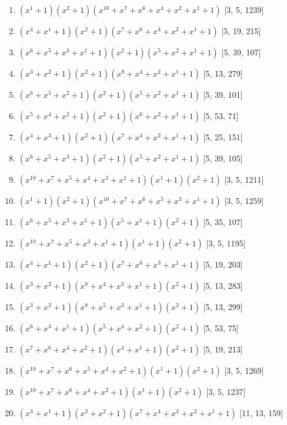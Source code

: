 \documentclass[10pt,twocolumn]{article}
\begin{document}
\begin{enumerate}
\item $(x^{1} + 1)(x^{2} + 1)(x^{10} + x^{7} + x^{6} + x^{4} + x^{2} + x^{1} + 1)$  [3, 5, 1239]
\item $(x^{4} + x^{1} + 1)(x^{2} + 1)(x^{7} + x^{6} + x^{4} + x^{2} + x^{1} + 1)$  [5, 19, 215]
\item $(x^{6} + x^{5} + x^{3} + x^{1} + 1)(x^{2} + 1)(x^{5} + x^{2} + x^{1} + 1)$  [5, 39, 107]
\item $(x^{3} + x^{2} + 1)(x^{2} + 1)(x^{8} + x^{4} + x^{2} + x^{1} + 1)$  [5, 13, 279]
\item $(x^{6} + x^{5} + x^{2} + 1)(x^{2} + 1)(x^{5} + x^{2} + x^{1} + 1)$  [5, 39, 101]
\item $(x^{5} + x^{4} + x^{2} + 1)(x^{2} + 1)(x^{6} + x^{2} + x^{1} + 1)$  [5, 53, 71]
\item $(x^{4} + x^{3} + 1)(x^{2} + 1)(x^{7} + x^{4} + x^{2} + x^{1} + 1)$  [5, 25, 151]
\item $(x^{6} + x^{5} + x^{3} + 1)(x^{2} + 1)(x^{5} + x^{2} + x^{1} + 1)$  [5, 39, 105]
\item $(x^{10} + x^{7} + x^{5} + x^{4} + x^{3} + x^{1} + 1)(x^{1} + 1)(x^{2} + 1)$  [3, 5, 1211]
\item $(x^{1} + 1)(x^{2} + 1)(x^{10} + x^{7} + x^{6} + x^{5} + x^{3} + x^{1} + 1)$  [3, 5, 1259]
\item $(x^{6} + x^{5} + x^{3} + x^{1} + 1)(x^{5} + x^{1} + 1)(x^{2} + 1)$  [5, 35, 107]
\item $(x^{10} + x^{7} + x^{5} + x^{3} + x^{1} + 1)(x^{1} + 1)(x^{2} + 1)$  [3, 5, 1195]
\item $(x^{4} + x^{1} + 1)(x^{2} + 1)(x^{7} + x^{6} + x^{3} + x^{1} + 1)$  [5, 19, 203]
\item $(x^{3} + x^{2} + 1)(x^{8} + x^{4} + x^{3} + x^{1} + 1)(x^{2} + 1)$  [5, 13, 283]
\item $(x^{3} + x^{2} + 1)(x^{8} + x^{5} + x^{3} + x^{1} + 1)(x^{2} + 1)$  [5, 13, 299]
\item $(x^{6} + x^{3} + x^{1} + 1)(x^{5} + x^{4} + x^{2} + 1)(x^{2} + 1)$  [5, 53, 75]
\item $(x^{7} + x^{6} + x^{4} + x^{2} + 1)(x^{4} + x^{1} + 1)(x^{2} + 1)$  [5, 19, 213]
\item $(x^{10} + x^{7} + x^{6} + x^{5} + x^{4} + x^{2} + 1)(x^{1} + 1)(x^{2} + 1)$  [3, 5, 1269]
\item $(x^{10} + x^{7} + x^{6} + x^{4} + x^{2} + 1)(x^{1} + 1)(x^{2} + 1)$  [3, 5, 1237]
\item $(x^{3} + x^{1} + 1)(x^{3} + x^{2} + 1)(x^{7} + x^{4} + x^{3} + x^{2} + x^{1} + 1)$  [11, 13, 159]

\end{enumerate}
\end{document}
